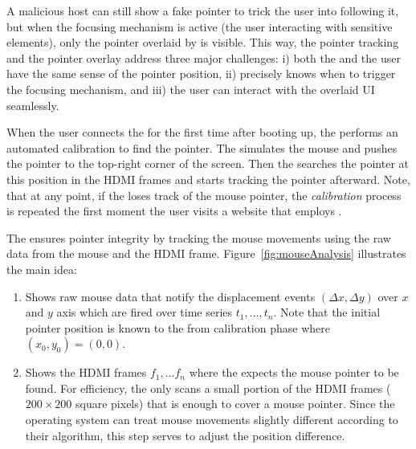 A malicious host can still show a fake pointer to trick the user into following it, but when the focusing mechanism is active (the user interacting with sensitive elements), only the pointer overlaid by \device is visible. This way, the pointer tracking and the pointer overlay address three major challenges: i) both the \device and the user have the same sense of the pointer position, ii) \device precisely knows when to trigger the focusing mechanism, and iii) the user can interact with the overlaid UI seamlessly. 


\label{sec:systemDesign:analysis:calibration} 
When the user connects the \device for the first time after booting up, the \device performs an automated calibration to find the pointer. The \device simulates the mouse and pushes the pointer to the top-right corner of the screen. Then the \device searches the pointer at this position in the HDMI frames
and starts tracking the pointer afterward. Note, that at any point, if the \device loses track of the mouse pointer, the \emph{calibration} process is repeated the first moment the user visits a website that employs \name.

 The \device ensures pointer integrity by tracking the mouse movements using the raw data from the mouse and the HDMI frame.  Figure~\ref{fig:mouseAnalysis} illustrates the main idea: 

\begin{enumerate}
\item[]\one Shows raw mouse data that notify the displacement events $(\Delta x, \Delta y)$ over $x$ and $y$ axis which are fired over time series $t_1,\ldots, t_n$. Note that the initial pointer position is known to the \device from calibration phase where $(x_0, y_0) = (0, 0)$.  
\item[]\two Shows the HDMI frames $f_1,\ldots f_n$ where the \device expects the mouse pointer to be found. For efficiency, the \device only scans a small portion of the HDMI frames ($200 \times 200$ square pixels) that is enough to cover a mouse pointer. Since the operating system can treat mouse movements slightly different according to their algorithm, this step serves to adjust the position difference.
\end{enumerate}



